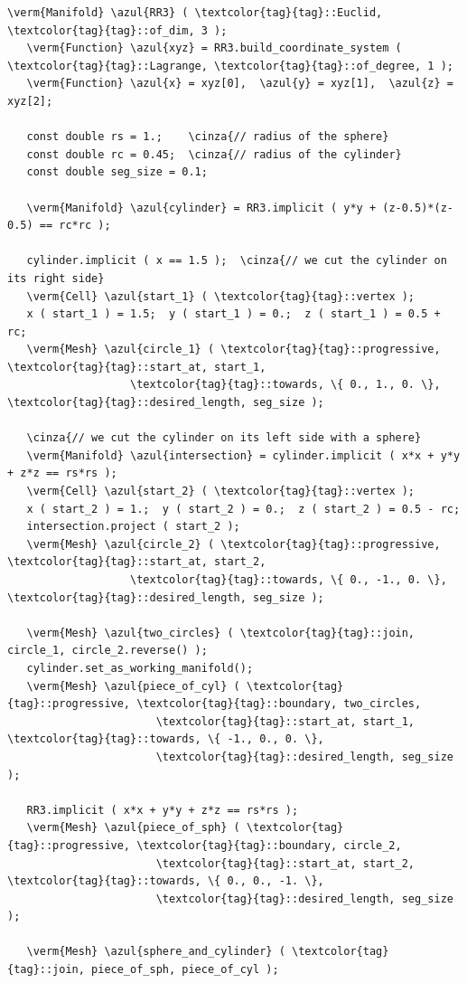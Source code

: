 \begin{Verbatim}[commandchars=\\\{\},formatcom=\small\tt,frame=single,
   label=parag-\ref{\numb section 3.\numb parag 18}.cpp,rulecolor=\color{coment},
   baselinestretch=0.94,framesep=2mm                                            ]
   \verm{Manifold} \azul{RR3} ( \textcolor{tag}{tag}::Euclid, \textcolor{tag}{tag}::of_dim, 3 );
   \verm{Function} \azul{xyz} = RR3.build_coordinate_system ( \textcolor{tag}{tag}::Lagrange, \textcolor{tag}{tag}::of_degree, 1 );
   \verm{Function} \azul{x} = xyz[0],  \azul{y} = xyz[1],  \azul{z} = xyz[2];

   const double rs = 1.;    \cinza{// radius of the sphere}
   const double rc = 0.45;  \cinza{// radius of the cylinder}
   const double seg_size = 0.1;

   \verm{Manifold} \azul{cylinder} = RR3.implicit ( y*y + (z-0.5)*(z-0.5) == rc*rc );

   cylinder.implicit ( x == 1.5 );  \cinza{// we cut the cylinder on its right side}
   \verm{Cell} \azul{start_1} ( \textcolor{tag}{tag}::vertex );
   x ( start_1 ) = 1.5;  y ( start_1 ) = 0.;  z ( start_1 ) = 0.5 + rc;
   \verm{Mesh} \azul{circle_1} ( \textcolor{tag}{tag}::progressive, \textcolor{tag}{tag}::start_at, start_1,
                   \textcolor{tag}{tag}::towards, \{ 0., 1., 0. \}, \textcolor{tag}{tag}::desired_length, seg_size );

   \cinza{// we cut the cylinder on its left side with a sphere}
   \verm{Manifold} \azul{intersection} = cylinder.implicit ( x*x + y*y + z*z == rs*rs );
   \verm{Cell} \azul{start_2} ( \textcolor{tag}{tag}::vertex );
   x ( start_2 ) = 1.;  y ( start_2 ) = 0.;  z ( start_2 ) = 0.5 - rc;
   intersection.project ( start_2 );
   \verm{Mesh} \azul{circle_2} ( \textcolor{tag}{tag}::progressive, \textcolor{tag}{tag}::start_at, start_2,
                   \textcolor{tag}{tag}::towards, \{ 0., -1., 0. \}, \textcolor{tag}{tag}::desired_length, seg_size );

   \verm{Mesh} \azul{two_circles} ( \textcolor{tag}{tag}::join, circle_1, circle_2.reverse() );
   cylinder.set_as_working_manifold();
   \verm{Mesh} \azul{piece_of_cyl} ( \textcolor{tag}{tag}::progressive, \textcolor{tag}{tag}::boundary, two_circles,
                       \textcolor{tag}{tag}::start_at, start_1, \textcolor{tag}{tag}::towards, \{ -1., 0., 0. \},
                       \textcolor{tag}{tag}::desired_length, seg_size                          );

   RR3.implicit ( x*x + y*y + z*z == rs*rs );
   \verm{Mesh} \azul{piece_of_sph} ( \textcolor{tag}{tag}::progressive, \textcolor{tag}{tag}::boundary, circle_2,
                       \textcolor{tag}{tag}::start_at, start_2, \textcolor{tag}{tag}::towards, \{ 0., 0., -1. \},
                       \textcolor{tag}{tag}::desired_length, seg_size                         );
                       
   \verm{Mesh} \azul{sphere_and_cylinder} ( \textcolor{tag}{tag}::join, piece_of_sph, piece_of_cyl );
\end{Verbatim}

